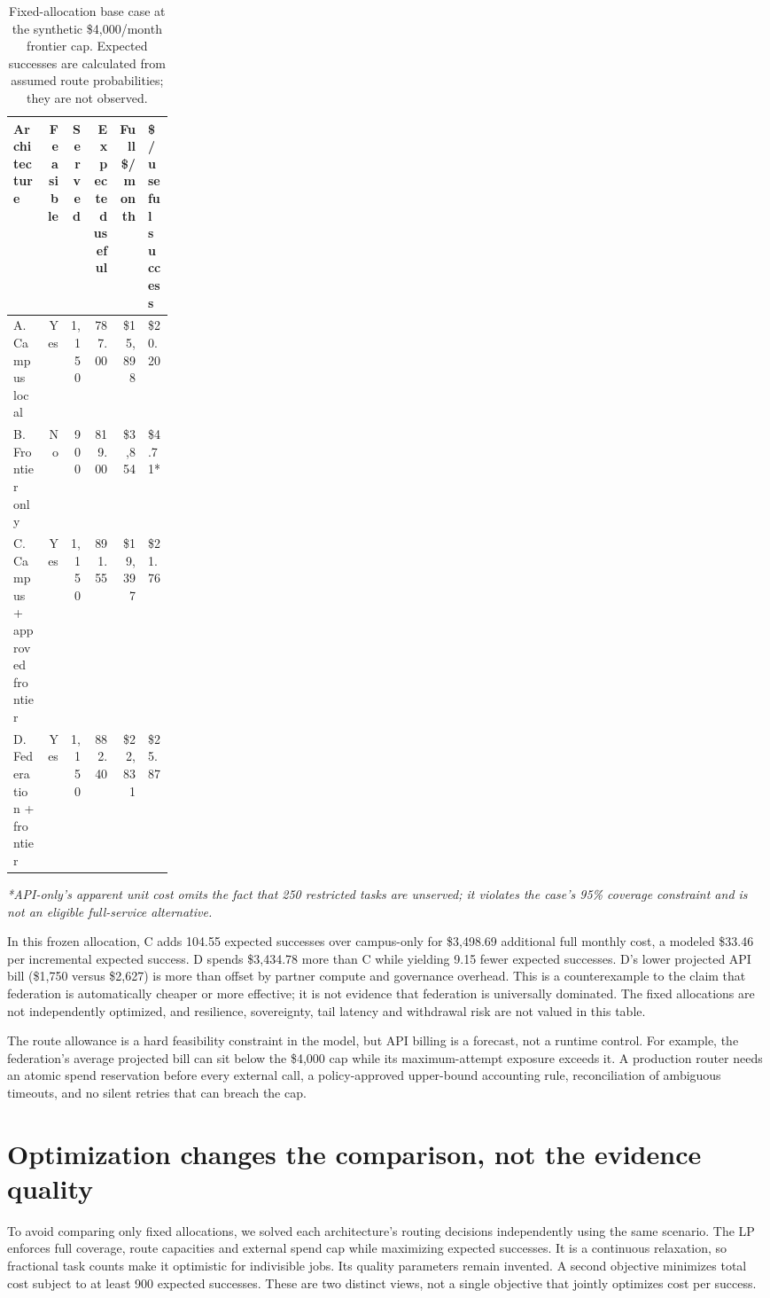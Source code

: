\begin{table}[ht]
\centering\small
\caption{Fixed-allocation base case at the synthetic \$4,000/month frontier cap. Expected successes are calculated from assumed route probabilities; they are not observed.}
\begin{tabularx}{\linewidth}{p{0.21\linewidth}r r r r X}
\toprule
Architecture & Feasible & Served & Expected useful & Full \$/month & \$/useful success \\
\midrule
A. Campus local & Yes & 1,150 & 787.00 & \$15,898 & \$20.20 \\
B. Frontier only & No & 900 & 819.00 & \$3,854 & \$4.71* \\
C. Campus + approved frontier & Yes & 1,150 & 891.55 & \$19,397 & \$21.76 \\
D. Federation + frontier & Yes & 1,150 & 882.40 & \$22,831 & \$25.87 \\
\bottomrule
\end{tabularx}
\end{table}
\smallskip\textit{*API-only's apparent unit cost omits the fact that 250 restricted tasks are unserved; it violates the case's 95\% coverage constraint and is not an eligible full-service alternative.}

In this frozen allocation, C adds 104.55 expected successes over campus-only for \$3,498.69 additional full monthly cost, a modeled \$33.46 per incremental expected success. D spends \$3,434.78 more than C while yielding 9.15 fewer expected successes. D's lower projected API bill (\$1,750 versus \$2,627) is more than offset by partner compute and governance overhead. This is a counterexample to the claim that federation is automatically cheaper or more effective; it is not evidence that federation is universally dominated. The fixed allocations are not independently optimized, and resilience, sovereignty, tail latency and withdrawal risk are not valued in this table.

The route allowance is a hard feasibility constraint in the model, but API billing is a forecast, not a runtime control. For example, the federation's average projected bill can sit below the \$4,000 cap while its maximum-attempt exposure exceeds it. A production router needs an atomic spend reservation before every external call, a policy-approved upper-bound accounting rule, reconciliation of ambiguous timeouts, and no silent retries that can breach the cap.

\section{Optimization changes the comparison, not the evidence quality}
To avoid comparing only fixed allocations, we solved each architecture's routing decisions independently using the same scenario. The LP enforces full coverage, route capacities and external spend cap while maximizing expected successes. It is a continuous relaxation, so fractional task counts make it optimistic for indivisible jobs. Its quality parameters remain invented. A second objective minimizes total cost subject to at least 900 expected successes. These are two distinct views, not a single objective that jointly optimizes cost per success.

